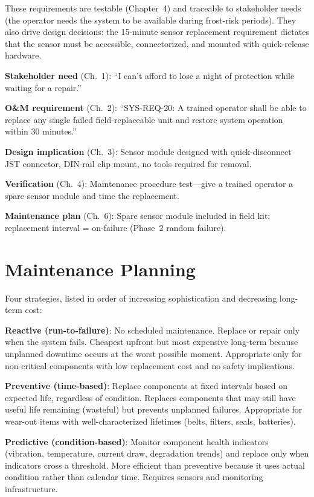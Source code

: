 \documentclass[11pt,letterpaper,twoside,openany]{book}
\begin{document}
These requirements are testable (Chapter~4) and traceable to stakeholder needs (the operator needs the system to be available during frost-risk periods). They also drive design decisions: the 15-minute sensor replacement requirement dictates that the sensor must be accessible, connectorized, and mounted with quick-release hardware.

\begin{keyconceptbox}
\textbf{Stakeholder need} (Ch.~1): ``I can't afford to lose a night of protection while waiting for a repair.''

\textbf{O\&M requirement} (Ch.~2): ``SYS-REQ-20: A trained operator shall be able to replace any single failed field-replaceable unit and restore system operation within 30 minutes.''

\textbf{Design implication} (Ch.~3): Sensor module designed with quick-disconnect JST connector, DIN-rail clip mount, no tools required for removal.

\textbf{Verification} (Ch.~4): Maintenance procedure test---give a trained operator a spare sensor module and time the replacement.

\textbf{Maintenance plan} (Ch.~6): Spare sensor module included in field kit; replacement interval = on-failure (Phase~2 random failure).
\end{keyconceptbox}

\FloatBarrier
\section{Maintenance Planning}
Four strategies, listed in order of increasing sophistication and decreasing long-term cost:

\textbf{Reactive (run-to-failure)}: No scheduled maintenance. Replace or repair only when the system fails. Cheapest upfront but most expensive long-term because unplanned downtime occurs at the worst possible moment. Appropriate only for non-critical components with low replacement cost and no safety implications.

\textbf{Preventive (time-based)}: Replace components at fixed intervals based on expected life, regardless of condition. Replaces components that may still have useful life remaining (wasteful) but prevents unplanned failures. Appropriate for wear-out items with well-characterized lifetimes (belts, filters, seals, batteries).

\textbf{Predictive (condition-based)}: Monitor component health indicators (vibration, temperature, current draw, degradation trends) and replace only when indicators cross a threshold. More efficient than preventive because it uses actual condition rather than calendar time. Requires sensors and monitoring infrastructure.
\end{document}
